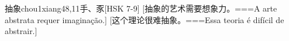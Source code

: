 \begin{EntryWithPhonetic}{抽象}{chou1xiang4}{8,11}{⼿、⾗}[HSK 7-9]
  [抽象的艺术需要想象力。===A arte abstrata requer imaginação.]
  [这个理论很难抽象。===Essa teoria é difícil de abstrair.]
\end{EntryWithPhonetic}
